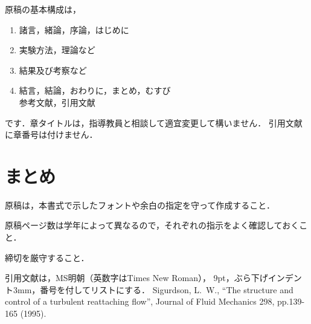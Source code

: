 \documentclass[nogutter]{ac-resume}
\begin{document}
原稿の基本構成は，
\begin{enumerate}
	\item 諸言，緒論，序論，はじめに
	\item 実験方法，理論など
	\item 結果及び考察など
	\item 結言，結論，おわりに，まとめ，むすび\\
	参考文献，引用文献
\end{enumerate}
です．章タイトルは，指導教員と相談して適宜変更して構いません．
引用文献に章番号は付けません．

\section{まとめ}

原稿は，本書式で示したフォントや余白の指定を守って作成すること．

原稿ページ数は学年によって異なるので，それぞれの指示をよく確認しておくこと．

締切を厳守すること．

\begin{thebibliography}{9}
	\small
	引用文献は，MS明朝（英数字はTimes New Roman），
	9pt，ぶら下げインデント3mm，番号を付してリストにする．
	Sigurdson, L.~W.,
	``The structure and control of a turbulent reattaching flow'',
	Journal of Fluid Mechanics 298, pp.139-165 (1995).
\end{thebibliography}
\end{document}
